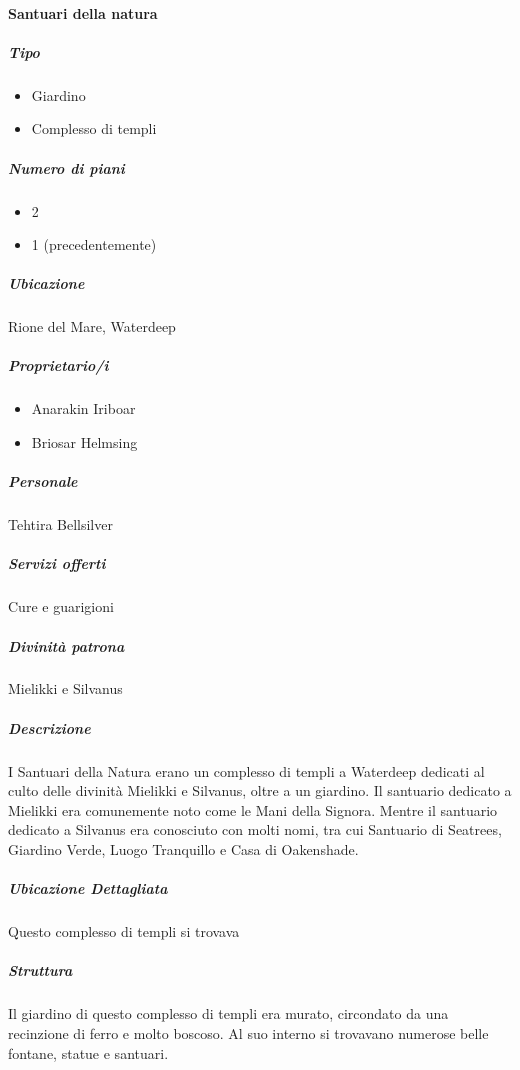 \documentclass{article}
\begin{document}
              \paragraph{Santuari della natura}
              \subparagraph{Tipo}
              \begin{itemize}
                  \item Giardino
                  \item Complesso di templi
              \end{itemize}
              
              \subparagraph{Numero di piani}
              \begin{itemize}
                  \item 2
                  \item 1 (precedentemente)
              \end{itemize}
              
              \subparagraph{Ubicazione}
              Rione del Mare, Waterdeep
              
              \subparagraph{Proprietario/i}
              \begin{itemize}
                  \item Anarakin Iriboar
                  \item Briosar Helmsing
              \end{itemize}
              
              \subparagraph{Personale}
              Tehtira Bellsilver
              
              \subparagraph{Servizi offerti}
              Cure e guarigioni
              
              \subparagraph{Divinità patrona}
              Mielikki e Silvanus
              
              \subparagraph{Descrizione}
              I Santuari della Natura erano un complesso di templi a Waterdeep dedicati al culto delle divinità Mielikki e Silvanus, oltre a un giardino. Il santuario dedicato a Mielikki era comunemente noto come le Mani della Signora. Mentre il santuario dedicato a Silvanus era conosciuto con molti nomi, tra cui Santuario di Seatrees, Giardino Verde, Luogo Tranquillo e Casa di Oakenshade.
              
              \subparagraph{Ubicazione Dettagliata}
              Questo complesso di templi si trovava
              
              \subparagraph{Struttura}
                Il giardino di questo complesso di templi era murato, circondato da una recinzione di ferro e molto boscoso. Al suo interno si trovavano numerose belle fontane, statue e santuari.
\end{document}
